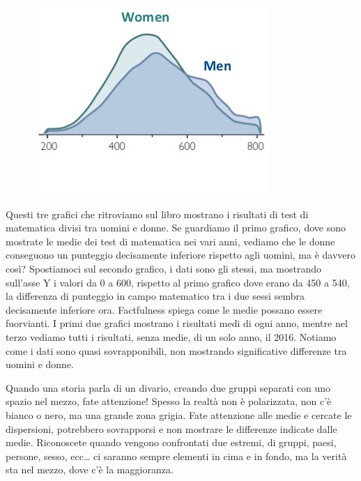 \documentclass[12pt]{book} %
\begin{document}
\begin{figure}[H]
\begin{minipage}{0.3\textwidth}
    \end{minipage}
    \hfill
    \begin{minipage}{0.3\textwidth}
        \centering
        \includegraphics[width=\linewidth]{images/Libro-img004.jpg}
    \end{minipage}
\end{figure}

Questi tre grafici che ritroviamo sul libro mostrano i risultati di test di matematica divisi tra uomini e donne. Se
guardiamo il primo grafico, dove sono mostrate le medie dei test di matematica nei vari anni, vediamo che le donne
conseguono un punteggio decisamente inferiore rispetto agli uomini, ma è davvero così? Spostiamoci sul secondo grafico,
i dati sono gli stessi, ma mostrando sull'asse Y i valori da 0 a 600, rispetto al primo grafico
dove erano da 450 a 540, la differenza di punteggio in campo matematico tra i due sessi sembra decisamente inferiore
ora. Factfulness spiega come le medie possano essere fuorvianti. I primi due grafici mostrano i risultati medi di ogni
anno, mentre nel terzo vediamo tutti i risultati, senza medie, di un solo anno, il 2016. Notiamo come i dati sono quasi
sovrapponibili, non mostrando significative differenze tra uomini e donne.

Quando una storia parla di un divario, creando due gruppi separati con uno spazio nel mezzo, fate attenzione! Spesso la
realtà non è polarizzata, non c'è bianco o nero, ma una grande zona grigia. Fate attenzione alle
medie e cercate le dispersioni, potrebbero sovrapporsi e non mostrare le differenze indicate dalle medie. Riconoscete
quando vengono confrontati due estremi, di gruppi, paesi, persone, sesso, ecc… ci saranno sempre elementi in cima e in
fondo, ma la verità sta nel mezzo, dove c'è la maggioranza.
\end{document}
